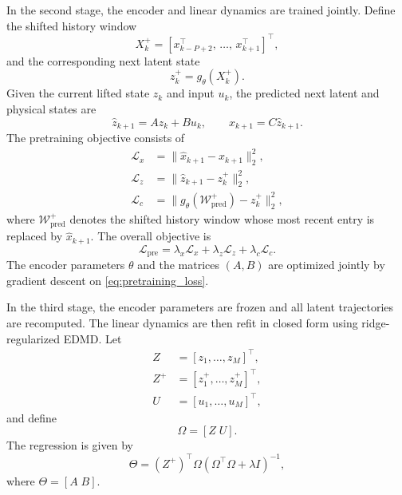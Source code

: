 \documentclass[journal]{IEEEtran}
\begin{document}
In the second stage, the encoder and linear dynamics are trained jointly. Define the shifted history window
\begin{equation}
    X_k^{+} = [x_{k-P+2}^\top,\,\ldots,\,x_{k+1}^\top]^\top,
\end{equation}
and the corresponding next latent state
\begin{equation}
    z_k^{+} = g_\theta(X_k^{+}).
\end{equation}
Given the current lifted state $z_k$ and input $u_k$, the predicted next latent and physical states are
\begin{equation}
    \hat{z}_{k+1} = A z_k + B u_k, 
    \qquad
    \hat{x}_{k+1} = C \hat{z}_{k+1}.
\end{equation}
The pretraining objective consists of
\begin{align}
    \mathcal{L}_{x} &= \|\hat{x}_{k+1}-x_{k+1}\|_2^2, \label{eq:loss_x}\\
    \mathcal{L}_{z} &= \|\hat{z}_{k+1}-z_k^{+}\|_2^2, \label{eq:loss_z}\\
    \mathcal{L}_{c} &= \bigl\|g_\theta(\mathcal{W}^{+}_{\mathrm{pred}})-z_k^{+}\bigr\|_2^2, \label{eq:loss_c}
\end{align}
where $\mathcal{W}^{+}_{\mathrm{pred}}$ denotes the shifted history window whose most recent entry is replaced by $\hat{x}_{k+1}$. The overall objective is
\begin{equation}
    \mathcal{L}_{\mathrm{pre}} = \lambda_x \mathcal{L}_x + \lambda_z \mathcal{L}_z + \lambda_c \mathcal{L}_c.
    \label{eq:pretraining_loss}
\end{equation}
The encoder parameters $\theta$ and the matrices $(A,B)$ are optimized jointly by gradient descent on \eqref{eq:pretraining_loss}.

In the third stage, the encoder parameters are frozen and all latent trajectories are recomputed. The linear dynamics are then refit in closed form using ridge-regularized EDMD. Let
\begin{align}
    Z &= [z_1,\ldots,z_M]^\top, \\
    Z^{+} &= [z_1^{+},\ldots,z_M^{+}]^\top, \\
    U &= [u_1,\ldots,u_M]^\top,
\end{align}
and define
\begin{equation}
    \Omega = [Z\;U].
\end{equation}
The regression is given by
\begin{equation}
    \Theta = (Z^{+})^\top \Omega \left(\Omega^\top \Omega + \lambda I\right)^{-1},
    \label{eq:edmd_solution}
\end{equation}
where $\Theta = [A\;B]$.
\end{document}
